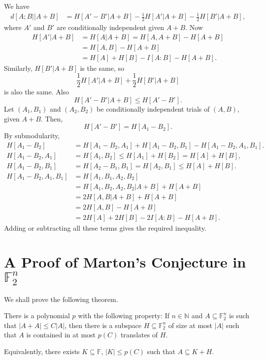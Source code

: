 \documentclass[12pt]{article}
\begin{document}
\begin{proofbox}
	We have
	\begin{align*}
		d[A; B || A + B] &= H[A' - B' | A + B] - \frac 12 H[A' | A + B] - \frac 12 H[B'|A + B],
	\end{align*}
	where $A'$ and $B'$ are conditionally independent given $A + B$. Now
	\begin{align*}
		H[A'|A+B] &= H[A|A+B] = H[A,A+B] - H[A + B] \\
			  &= H[A, B] - H[A + B] \\
			  &= H[A] + H[B] - I[A:B] - H[A + B].
	\end{align*}
	Similarly, $H[B'|A+B]$ is the same, so
	\[
		\frac 12 H[A'|A+B] + \frac 12 H[B'|A+B]
	\]
	is also the same. Also
	\[
		H[A' - B'|A + B] \leq H[A' - B'].
	\]
	Let $(A_1, B_1)$ and $(A_2, B_2)$ be conditionally independent trials of $(A, B)$, given $A + B$. Then,
	\[
		H[A' - B'] = H[A_1 - B_2].
	\]
	By submodularity,
	\begin{align*}
		H[A_1 - B_2] &= H[A_1 - B_2, A_1] + H[A_1 - B_2, B_1] - H[A_1 - B_2, A_1, B_1]. \\
		H[A_1 - B_2, A_1] &= H[A_1, B_2] \leq H[A_1] + H[B_2] = H[A] + H[B], \\
		H[A_1 - B_2, B_1] &= H[A_2 - B_1, B_1] = H[A_2, B_1] \leq H[A] + H[B]. \\
		H[A_1 - B_2, A_1, B_1] &= H[A_1, B_1, A_2, B_2] \\
				       &= H[A_1, B_2, A_2, B_2|A+B] + H[A+B] \\
				       &= 2H[A, B|A+B] + H[A + B] \\
				       &= 2 H[A, B] - H[A + B] \\
				       &= 2 H[A] + 2 H[B] - 2 I[A:B] - H[A + B].
	\end{align*}
	Adding or subtracting all these terms gives the required inequality.
\end{proofbox}


\newpage

\section{A Proof of Marton's Conjecture in \texorpdfstring{$\mathbb{F}_2^{n}$}{F2^n}}%
\label{sec:apmc}

We shall prove the following theorem.

\begin{theorem}
	There is a polynomial $p$ with the following property: If $n \in \mathbb{N}$ and $A \subseteq \mathbb{F}_2^{n}$ is such that $|A + A| \leq C|A|$, then there is a subspace $H \subseteq \mathbb{F}_2^{n}$ of size at most $|A|$ such that $A$ is contained in at most $p(C)$ translates of $H$.

	Equivalently, there exists $K \subseteq \mathbb{F}$, $|K| \leq p(C)$ such that $A \subseteq K + H$.
\end{theorem}
\end{document}
